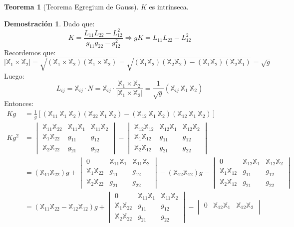 \documentclass[twoside]{report}
\theoremstyle{definition}
\newtheorem{theorem}{Teorema}[section]
\newtheorem*{dem}{Demostración}
\numberwithin{equation}{section}
\newcommand{\X}{\mathbb{X}}
\newcommand{\luego}{\Rightarrow}
\begin{document}
\begin{theorem}[Teorema Egregium de Gauss]
$K$ es intrínseca.
\end{theorem}
\begin{dem}
Dado que:
\[ K = \frac{L_{11}L_{22} - L_{12}^2}{g_{11}g_{22} - g_{12}^2} \luego gK = L_{11}L_{22} - L_{12}^2 \]
Recordemos que:
\[ |\X_1 \times \X_2| = \sqrt{(\X_1 \times \X_2)(\X_1 \times \X_2)} = \sqrt{(\X_1 \X_2)(\X_2 \X_2) - (\X_1 \X_2)(\X_2 \X_1)} = \sqrt{g} \]
Luego:
\[ L_{ij} = \X_{ij} \cdot N = \X_{ij} \cdot \frac{\X_1 \times \X_2}{|\X_1 \times \X_2|} = \frac{1}{\sqrt{g}} (\X_{ij} \ \X_1\ \X_2) \]
Entonces:
\begin{align}
K g & =  \frac{1}{g} [(\X_{11}\ \X_1\ \X_2)(\X_{22}\ \X_1\ \X_2) - (\X_{12}\ \X_1\ \X_2)(\X_{12}\ \X_1\ \X_2)]\nonumber\\
K g^2 & = 
\begin{vmatrix}
	\X_{11} \X_{22} & \X_{11} \X_1 & \X_{11} \X_2\\
	\X_1 \X_{22} & g_{11} & g_{12}\\
	\X_2 \X_{22} & g_{21} & g_{22}
\end{vmatrix} -
\begin{vmatrix}
	\X_{12} \X_{12} & \X_{12} \X_1 & \X_{12} \X_2\\
	\X_1 \X_{12} & g_{11} & g_{12}\\
	\X_2 \X_{12} & g_{21} & g_{22}
\end{vmatrix}\nonumber\\
& = (\X_{11} \X_{22}) g +
\begin{vmatrix}
	0 & \X_{11} \X_1 & \X_{11} \X_2\\
	\X_1 \X_{22} & g_{11} & g_{12}\\
	\X_2 \X_{22} & g_{21} & g_{22}
\end{vmatrix} - (\X_{12}\X_{12})g -
\begin{vmatrix}
	0 & \X_{12} \X_1 & \X_{12} \X_2\\
	\X_1 \X_{12} & g_{11} & g_{12}\\
	\X_2 \X_{12} & g_{21} & g_{22}
\end{vmatrix}\nonumber\\
& = (\X_{11} \X_{22} - \X_{12} \X_{12})g + \begin{vmatrix}
	0 & \X_{11} \X_1 & \X_{11} \X_2\\
	\X_1 \X_{22} & g_{11} & g_{12}\\
	\X_2 \X_{22} & g_{21} & g_{22}
\end{vmatrix}-
\begin{vmatrix}
	0 & \X_{12} \X_1 & \X_{12} \X_2\\

\end{vmatrix}
\end{align}
\end{dem}
\end{document}
